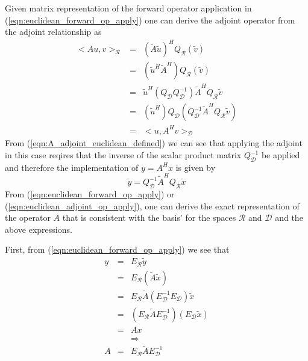 Given matrix representation of the forward operator application in
(\ref{eqn:euclidean_forward_op_apply}) one can derive the adjoint operator
from the adjoint relationship as
%
\begin{eqnarray}
<A u, v>_{\mathcal{R}}
& = & ( \tilde{A} \tilde{u} )^H Q_{\mathcal{R}} (\tilde{v}) \nonumber \\
& = & ( \tilde{u}^H \tilde{A}^H ) Q_{\mathcal{R}} (\tilde{v}) \nonumber \\
& = & \tilde{u}^H ( Q_{\mathcal{D}} Q_{\mathcal{D}}^{-1} ) \tilde{A}^H Q_{\mathcal{R}} \tilde{v} \nonumber \\
& = & ( \tilde{u}^H ) Q_{\mathcal{D}} ( Q_{\mathcal{D}}^{-1} \tilde{A}^H Q_{\mathcal{R}} \tilde{v} ) \nonumber \\
& = & <u, A^H v>_{\mathcal{D}}
\label{eqn:A_adjoint_euclidean_defined}
\end{eqnarray}
%
From (\ref{eqn:A_adjoint_euclidean_defined}) we can see that applying the
adjoint in this case reqires that the inverse of the scalar product matrix
$Q_{\mathcal{D}}^{-1}$ be applied and therefore the implementation of $y=A^H
x$ is given by
%
\begin{equation}
\tilde{y} = Q_{\mathcal{D}}^{-1} \tilde{A}^H Q_{\mathcal{R}} \tilde{x}
\label{eqn:euclidean_adjoint_op_apply}
\end{equation}
%
From (\ref{eqn:euclidean_forward_op_apply}) or
(\ref{eqn:euclidean_adjoint_op_apply}), one can derive the exact
representation of the operator $A$ that is consistent with the basis' for the
spaces $\mathcal{R}$ and $\mathcal{D}$ and the above expressions.

First, from (\ref{eqn:euclidean_forward_op_apply}) we see that
%
\begin{eqnarray}
y
& = & E_{\mathcal{R}} \tilde{y} \nonumber \\
& = & E_{\mathcal{R}} ( \tilde{A} \tilde{x} ) \nonumber \\
& = & E_{\mathcal{R}} \tilde{A} ( E_{\mathcal{D}}^{-1} E_{\mathcal{D}} ) \tilde{x} \nonumber \\
& = & ( E_{\mathcal{R}} \tilde{A} E_{\mathcal{D}}^{-1} ) ( E_{\mathcal{D}} \tilde{x} ) \nonumber \\
& = & A x \nonumber \\
&  & \Rightarrow \nonumber \\
A & = & E_{\mathcal{R}} \tilde{A} E_{\mathcal{D}}^{-1}
\label{eqn:A_euclidean}
\end{eqnarray}
%

